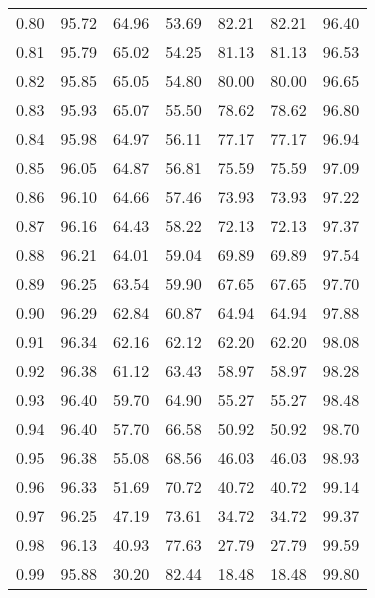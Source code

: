 \begin{tabular}{|c|c|c|c|c|c|c|}
      0.80 &     95.72 &     64.96 &      53.69 &   82.21 &      82.21 &         96.40 \\
      0.81 &     95.79 &     65.02 &      54.25 &   81.13 &      81.13 &         96.53 \\
      0.82 &     95.85 &     65.05 &      54.80 &   80.00 &      80.00 &         96.65 \\
      0.83 &     95.93 &     65.07 &      55.50 &   78.62 &      78.62 &         96.80 \\
      0.84 &     95.98 &     64.97 &      56.11 &   77.17 &      77.17 &         96.94 \\
      0.85 &     96.05 &     64.87 &      56.81 &   75.59 &      75.59 &         97.09 \\
      0.86 &     96.10 &     64.66 &      57.46 &   73.93 &      73.93 &         97.22 \\
      0.87 &     96.16 &     64.43 &      58.22 &   72.13 &      72.13 &         97.37 \\
      0.88 &     96.21 &     64.01 &      59.04 &   69.89 &      69.89 &         97.54 \\
      0.89 &     96.25 &     63.54 &      59.90 &   67.65 &      67.65 &         97.70 \\
      0.90 &     96.29 &     62.84 &      60.87 &   64.94 &      64.94 &         97.88 \\
      0.91 &     96.34 &     62.16 &      62.12 &   62.20 &      62.20 &         98.08 \\
      0.92 &     96.38 &     61.12 &      63.43 &   58.97 &      58.97 &         98.28 \\
      0.93 &     96.40 &     59.70 &      64.90 &   55.27 &      55.27 &         98.48 \\
      0.94 &     96.40 &     57.70 &      66.58 &   50.92 &      50.92 &         98.70 \\
      0.95 &     96.38 &     55.08 &      68.56 &   46.03 &      46.03 &         98.93 \\
      0.96 &     96.33 &     51.69 &      70.72 &   40.72 &      40.72 &         99.14 \\
      0.97 &     96.25 &     47.19 &      73.61 &   34.72 &      34.72 &         99.37 \\
      0.98 &     96.13 &     40.93 &      77.63 &   27.79 &      27.79 &         99.59 \\
      0.99 &     95.88 &     30.20 &      82.44 &   18.48 &      18.48 &         99.80 \\
\bottomrule
\end{tabular}
